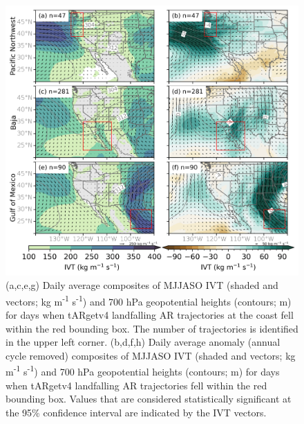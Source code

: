 \documentclass[draft,jgrga]{agutexSI2019}
\begin{document}
\begin{article}
\begin{figure}
\noindent\includegraphics[width=\textwidth]{figS9.png}
\caption{(a,c,e,g) Daily average composites of MJJASO IVT (shaded and vectors; kg m\textsuperscript{-1} s\textsuperscript{-1}) and 700 hPa geopotential heights (contours; m) for days when tARgetv4 landfalling AR trajectories at the coast fell within the red bounding box. The number of trajectories is identified in the upper left corner. (b,d,f,h) Daily average anomaly (annual cycle removed) composites of MJJASO IVT (shaded and vectors; kg m\textsuperscript{-1} s\textsuperscript{-1}) and 700 hPa geopotential heights (contours; m) for days when tARgetv4 landfalling AR trajectories fell within the red bounding box. Values that are considered statistically significant at the 95\% confidence interval are indicated by the IVT vectors.}
\label{fig:supp:composites_MJJASO_tARget}
\end{figure}


\end{article}
\end{document}

